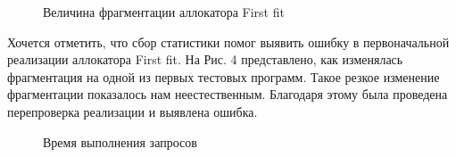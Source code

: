    \begin{figure}[p]
   \caption{Величина фрагментации аллокатора First fit}
   \label{ris:image}
   \end{figure}
   
    Хочется отметить, что сбор статистики помог выявить ошибку в первоначальной реализации аллокатора First fit. На Рис. 4 представлено, как изменялась фрагментация
   на одной из первых тестовых программ. 
   Такое резкое изменение фрагментации показалось нам неестественным. Благодаря этому была проведена перепроверка реализации и 
   выявлена ошибка.
   
   \begin{figure}[p]
   \caption{Время выполнения запросов}
   \label{ris:image}
   \end{figure}
   
